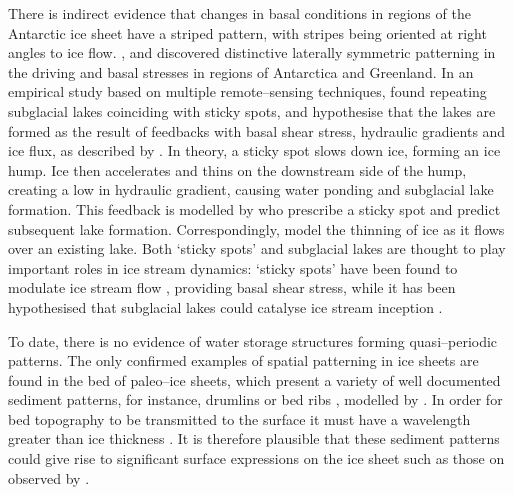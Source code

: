 \documentclass[journal abbreviation, manuscript]{copernicus}
\begin{document}

There is indirect evidence that changes in basal conditions in regions of the Antarctic 
ice sheet have a striped pattern, with stripes being oriented at 
right angles to ice flow.  \citet{sergienko2013regular}, and \citet{sergienko2014similarity} discovered distinctive laterally symmetric patterning in the driving and basal stresses in regions of Antarctica and Greenland. 
In an empirical study based on multiple remote--sensing techniques, \citet{fricker2010synthesizing} found repeating subglacial lakes coinciding with sticky spots, and hypothesise that the lakes are formed as the result of feedbacks with basal shear stress, hydraulic gradients and ice flux, as described by \cite{sergienko2007causes}. In theory, a sticky spot slows down ice, forming an ice hump. Ice then accelerates and thins on the downstream side of the hump, creating a low in hydraulic gradient, causing water ponding and subglacial lake formation. This feedback is modelled by \cite{sergienko2011sticky} who  prescribe a sticky spot and predict subsequent lake formation. Correspondingly, \citet{pattyn2003new} model the thinning of ice as it flows over an existing lake. Both `sticky spots' and subglacial lakes are thought to play important roles in ice stream dynamics: `sticky spots' have been found to modulate ice stream flow \citep{winberry2011dynamics}, providing basal shear stress, while it has been hypothesised that subglacial lakes could catalyse ice stream inception \citep{livingstone2013potential}. 

To date, there is no evidence of water storage structures forming quasi--periodic patterns. The only confirmed examples of spatial patterning in ice sheets are found in the bed of paleo--ice sheets, which present a variety of well documented sediment patterns, for instance, drumlins or bed ribs  \citep[e.g.][]{ kinahan1872general, hattestrand1997ribbed}, modelled by \citet{hindmarsh1998stability,hindmarsh1998ice, fowler2000instability, schoof2007pressure, dunlop2008bed,fowler2014instability}.
In order for bed topography to be transmitted to the surface it must have a wavelength greater than ice thickness  \citep{gudmundsson2003transmission}. It is therefore plausible that these sediment patterns could give rise to significant surface expressions on the ice sheet such as those on observed by \citet{sergienko2014similarity}.
\end{document}
